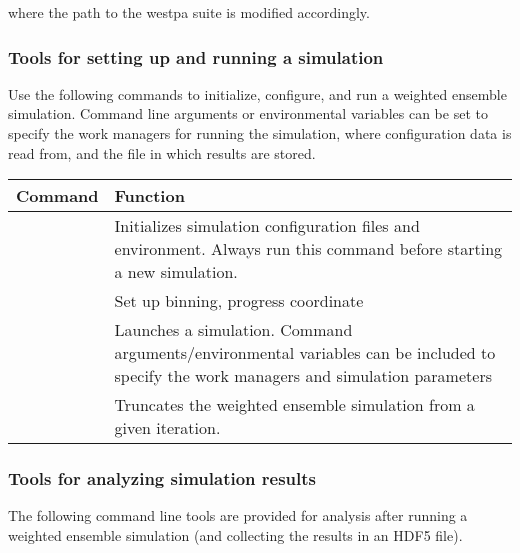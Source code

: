 \documentclass[letterpaper,10pt,english]{sphinxmanual}
\begin{document}
where the path to the westpa suite is modified accordingly.


\subsubsection{Tools for setting up and running a simulation}
\label{\detokenize{users_guide/west_tools:tools-for-setting-up-and-running-a-simulation}}
Use the following commands to initialize, configure, and run a weighted
ensemble simulation. Command line arguments or environmental variables can be
set to specify the work managers for running the simulation, where
configuration data is read from, and the  file in which results are
stored.


\begin{savenotes}\sphinxattablestart
\centering
\begin{tabulary}{\linewidth}[t]{|T|T|}
\hline
\sphinxstyletheadfamily 
Command
&\sphinxstyletheadfamily 
Function
\\
\hline
{\hyperref[\detokenize{users_guide/command_line_tools/w_init:w-init}]{}}
&
Initializes simulation configuration files and environment.
Always run this command before starting a new simulation.
\\
\hline
{\hyperref[\detokenize{users_guide/command_line_tools/w_bins:w-bins}]{}}
&
Set up binning, progress coordinate
\\
\hline
{\hyperref[\detokenize{users_guide/command_line_tools/w_run:w-run}]{}}
&
Launches a simulation. Command arguments/environmental
variables can be included to specify the work managers and
simulation parameters
\\
\hline
{\hyperref[\detokenize{users_guide/command_line_tools/w_truncate:w-truncate}]{}}
&
Truncates the weighted ensemble simulation from a given
iteration.
\\
\hline
\end{tabulary}
\par
\sphinxattableend\end{savenotes}


\subsubsection{Tools for analyzing simulation results}
\label{\detokenize{users_guide/west_tools:tools-for-analyzing-simulation-results}}
The following command line tools are provided for analysis after running a
weighted ensemble simulation (and collecting the results in an HDF5 file).
\end{document}
